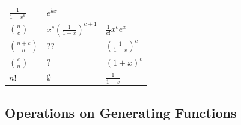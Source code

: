 \begin{longtable}[]{@{}lll@{}}
\begin{minipage}[t]{0.30\columnwidth}
\(\frac 1 {1-x^k}\)\strut
\end{minipage} & \begin{minipage}[t]{0.30\columnwidth}\raggedright
\(e^{kx}\)\strut
\end{minipage}\tabularnewline
\begin{minipage}[t]{0.30\columnwidth}\raggedright
\({n \choose c}\)\strut
\end{minipage} & \begin{minipage}[t]{0.30\columnwidth}\raggedright
\(x^c \left(\frac{1}{1-x}\right)^{c+1}\)\strut
\end{minipage} & \begin{minipage}[t]{0.30\columnwidth}\raggedright
\(\frac{1}{c!}x^ce^x\)\strut
\end{minipage}\tabularnewline
\begin{minipage}[t]{0.30\columnwidth}\raggedright
\({n+c \choose n}\)\strut
\end{minipage} & \begin{minipage}[t]{0.30\columnwidth}\raggedright
\(??\)\strut
\end{minipage} & \begin{minipage}[t]{0.30\columnwidth}\raggedright
\(\left( \frac 1 {1-x} \right)^c\)\strut
\end{minipage}\tabularnewline
\begin{minipage}[t]{0.30\columnwidth}\raggedright
\({c \choose n}\)\strut
\end{minipage} & \begin{minipage}[t]{0.30\columnwidth}\raggedright
\(?\)\strut
\end{minipage} & \begin{minipage}[t]{0.30\columnwidth}\raggedright
\((1+x)^c\)\strut
\end{minipage}\tabularnewline
\begin{minipage}[t]{0.30\columnwidth}\raggedright
\(n!\)\strut
\end{minipage} & \begin{minipage}[t]{0.30\columnwidth}\raggedright
\(\emptyset\)\strut
\end{minipage} & \begin{minipage}[t]{0.30\columnwidth}\raggedright
\(\frac{1}{1-x}\)\strut
\end{minipage}\tabularnewline
\bottomrule
\end{longtable}

\hypertarget{operations-on-generating-functions}{%
\subsection{Operations on Generating
Functions}\label{operations-on-generating-functions}}

